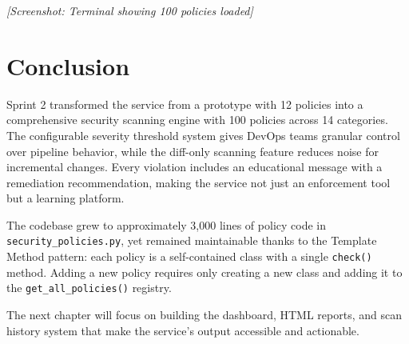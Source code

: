 
\textit{[Screenshot: Terminal showing 100 policies loaded]}

\section{Conclusion}

Sprint 2 transformed the service from a prototype with 12 policies into a comprehensive security scanning engine with 100 policies across 14 categories. The configurable severity threshold system gives DevOps teams granular control over pipeline behavior, while the diff-only scanning feature reduces noise for incremental changes. Every violation includes an educational message with a remediation recommendation, making the service not just an enforcement tool but a learning platform.

The codebase grew to approximately 3,000 lines of policy code in \texttt{security\_policies.py}, yet remained maintainable thanks to the Template Method pattern: each policy is a self-contained class with a single \texttt{check()} method. Adding a new policy requires only creating a new class and adding it to the \texttt{get\_all\_policies()} registry.

The next chapter will focus on building the dashboard, HTML reports, and scan history system that make the service's output accessible and actionable.
